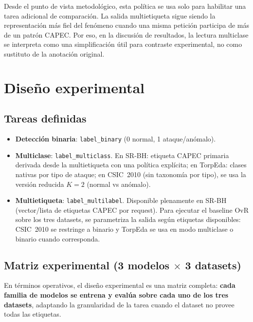 \documentclass[12pt,oneside]{report}
\begin{document}
Desde el punto de vista metodológico, esta política se usa solo para habilitar una tarea adicional de comparación. La salida multietiqueta sigue siendo la representación más fiel del fenómeno cuando una misma petición participa de más de un patrón CAPEC. Por eso, en la discusión de resultados, la lectura multiclase se interpreta como una simplificación útil para contraste experimental, no como sustituto de la anotación original.


\chapter{Diseño experimental}

\section{Tareas definidas}
\begin{itemize}[leftmargin=*]
  \item \textbf{Detección binaria}: \texttt{label\_binary} (0 normal, 1 ataque/anómalo).
  \item \textbf{Multiclase}: \texttt{label\_multiclass}. En SR-BH: etiqueta CAPEC primaria derivada desde la multietiqueta con una política explícita; en TorpEda: clases nativas por tipo de ataque; en CSIC~2010 (sin taxonomía por tipo), se usa la versión reducida $K=2$ (normal vs anómalo).
  \item \textbf{Multietiqueta}: \texttt{label\_multilabel}. Disponible plenamente en SR-BH (vector/lista de etiquetas CAPEC por request). Para ejecutar el baseline OvR sobre los tres datasets, se parametriza la salida según etiquetas disponibles: CSIC~2010 se restringe a binario y TorpEda se usa en modo multiclase o binario cuando corresponda.
\end{itemize}

\section{Matriz experimental (3 modelos $\times$ 3 datasets)}
En términos operativos, el diseño experimental es una matriz completa: \textbf{cada familia de modelos se entrena y evalúa sobre cada uno de los tres datasets}, adaptando la granularidad de la tarea cuando el dataset no provee todas las etiquetas.
\end{document}
